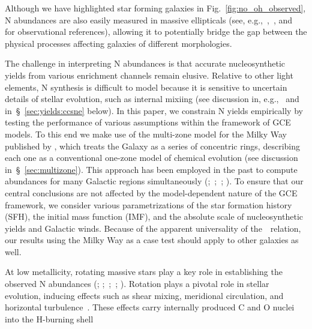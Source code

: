 \documentclass[ms.tex]{subfiles}
\begin{document}
Although we have highlighted star forming galaxies in
Fig.~\ref{fig:no_oh_observed}, N abundances are also easily measured in
massive ellipticals (see, e.g.,~\citealp{Schiavon2010},~\citealp{Conroy2013},
and~\citealp*{Conroy2014} for observational references), allowing it to
potentially bridge the gap between the physical processes affecting galaxies of
different morphologies.
\par
The challenge in interpreting N abundances is that accurate nucleosynthetic
yields from various enrichment channels remain elusive.
Relative to other light elements, N synthesis is difficult to model because it
is sensitive to uncertain details of stellar evolution, such as internal
mixiing (see discussion in, e.g.,~\citealp{Andrews2017} and
in~\S~\ref{sec:yields:ccsne} below).
In this paper, we constrain N yields empirically by testing the performance of
various assumptions within the framework of GCE models.
To this end we make use of the multi-zone model for the Milky Way published by
\citet{Johnson2021}, which treats the Galaxy as a series of concentric rings,
describing each one as a conventional one-zone model of chemical evolution
(see discussion in~\S~\ref{sec:multizone}).
This approach has been employed in the past to compute abundances for many
Galactic regions simultaneously (\citealp{Matteucci1989, Wyse1989, Prantzos1995,
Schoenrich2009};~\citealp*{Minchev2013, Minchev2014};~\citealp{Minchev2017};
\citealp*{Sharma2021}).
To ensure that our central conclusions are not affected by the model-dependent
nature of the GCE framework, we consider various parametrizations of the star
formation history (SFH), the initial mass function (IMF), and the absolute
scale of nucleosynthetic yields and Galactic winds.
Because of the apparent universality of the~\ohno~relation, our results using
the Milky Way as a case test should apply to other galaxies as well.
\par
At low metallicity, rotating massive stars play a key role in establishing the
observed N abundances (\citealp*{Chiappini2003, Chiappini2005};
\citealp{Chiappini2006};~\citealp*{Kobayashi2011};~\citealp{Prantzos2018};
\citealp*{Grisoni2021}).
Rotation plays a pivotal role in stellar evolution, inducing effects such as
shear mixing, meridional circulation, and horizontal turbulence~\citep{Zahn1992, 
Maeder1998, Lagarde2012}.
These effects carry internally produced C and O nuclei into the H-burning shell
\end{document}
